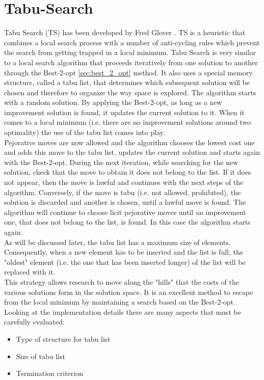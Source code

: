 \section{Tabu-Search}
Tabu Search (TS) has been developed by Fred Glover \cite{Glover1998}. TS is a heuristic that combines a local search process with a number of anti-cycling rules which prevent the search from getting trapped in a local minimum. Tabu Search is very similar to a local search algorithm that proceeds iteratively from one solution to another through the Best-2-opt \ref{sec:best_2_opt} method. It also uses a special memory structure, called a tabu list, that determines which subsequent solution will be chosen and therefore to organize the way space is explored. The algorithm starts with a random solution. By applying the Best-2-opt, as long as a new improvement solution is found, it updates the current solution to it. When it comes to a local minimum (i.e. there are no improvement solutions around two optimality) the use of the tabu list comes into play.\\
Pejorative moves are now allowed and the algorithm chooses the lowest cost one and adds this move to the tabu list, updates the current solution and starts again with the Best-2-opt.
During the next iteration, while searching for the new solution, check that the move to obtain it does not belong to the list. If it does not appear, then the move is lawful and continues with the next steps of the algorithm. Conversely, if the move is tabu (i.e. not allowed, prohibited), the solution is discarded and another is chosen, until a lawful move is found. The algorithm will continue to choose licit pejorative moves until an improvement one, that does not belong to the list, is found. In this case the algorithm starts again.\\
As will be discussed later, the tabu list has a maximum size of elements. Consequently, when a new element has to be inserted and the list is full, the "oldest" element (i.e. the one that has been inserted longer) of the list will be replaced with it.\\
This strategy allows research to move along the "hills" that the costs of the various solutions form in the solution space. It is an excellent method to escape from the local minimum by maintaining a search based on the Best-2-opt.\\
Looking at the implementation details there are many aspects that must be carefully evaluated:

\begin{itemize}
\item Type of structure for tabu list
\item Size of tabu list
\item Termination criterion
\end{itemize}

